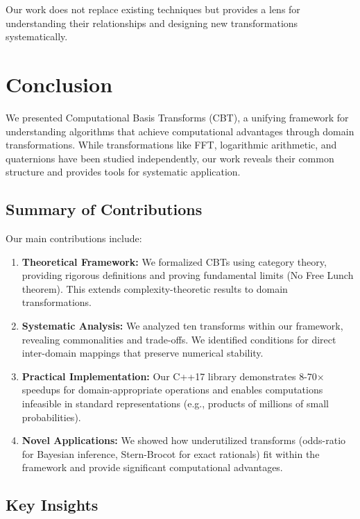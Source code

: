\documentclass[11pt]{article}
\theoremstyle{definition}
\begin{document}
Our work does not replace existing techniques but provides a lens for understanding their relationships and designing new transformations systematically.

\section{Conclusion}
\label{sec:conclusion}

We presented Computational Basis Transforms (CBT), a unifying framework for understanding algorithms that achieve computational advantages through domain transformations. While transformations like FFT, logarithmic arithmetic, and quaternions have been studied independently, our work reveals their common structure and provides tools for systematic application.

\subsection{Summary of Contributions}

Our main contributions include:

\begin{enumerate}
\item \textbf{Theoretical Framework:} We formalized CBTs using category theory, providing rigorous definitions and proving fundamental limits (No Free Lunch theorem). This extends complexity-theoretic results to domain transformations.

\item \textbf{Systematic Analysis:} We analyzed ten transforms within our framework, revealing commonalities and trade-offs. We identified conditions for direct inter-domain mappings that preserve numerical stability.

\item \textbf{Practical Implementation:} Our C++17 library demonstrates 8-70× speedups for domain-appropriate operations and enables computations infeasible in standard representations (e.g., products of millions of small probabilities).

\item \textbf{Novel Applications:} We showed how underutilized transforms (odds-ratio for Bayesian inference, Stern-Brocot for exact rationals) fit within the framework and provide significant computational advantages.
\end{enumerate}

\subsection{Key Insights}
\end{document}
